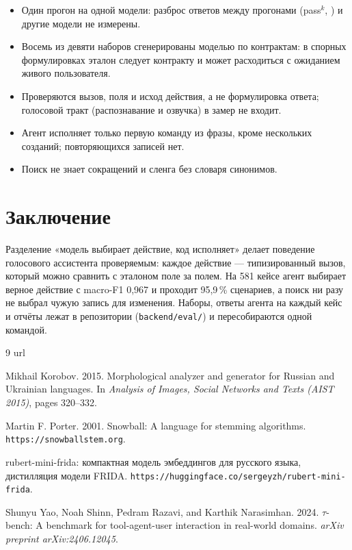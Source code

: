 \documentclass[10pt,a4paper,twocolumn]{article}
\newcommand{\code}[1]{\texttt{#1}}
\begin{document}
\begin{itemize}
  \item Один прогон на одной модели: разброс ответов между прогонами (pass$^k$,
    \citealp{yao2024taubench}) и другие модели не измерены.
  \item Восемь из девяти наборов сгенерированы моделью по контрактам: в спорных
    формулировках эталон следует контракту и может расходиться с ожиданием живого
    пользователя.
  \item Проверяются вызов, поля и исход действия, а не формулировка ответа; голосовой
    тракт (распознавание и озвучка) в замер не входит.
  \item Агент исполняет только первую команду из фразы, кроме нескольких созданий;
    повторяющихся записей нет.
  \item Поиск не знает сокращений и сленга без словаря синонимов.
\end{itemize}

\section{Заключение}

Разделение «модель выбирает действие, код исполняет» делает поведение голосового
ассистента проверяемым: каждое действие — типизированный вызов, который можно сравнить
с эталоном поле за полем. На 581 кейсе агент выбирает верное действие с macro-F1 0,967
и проходит 95,9\,\% сценариев, а поиск ни разу не выбрал чужую запись для изменения.
Наборы, ответы агента на каждый кейс и отчёты лежат в репозитории
(\code{backend/eval/}) и пересобираются одной командой.


\begin{thebibliography}{9}
\expandafter\ifx\csname url\endcsname\relax\def\url#1{\texttt{#1}}\fi

Mikhail Korobov. 2015. Morphological analyzer and generator for Russian and Ukrainian
languages. In \emph{Analysis of Images, Social Networks and Texts (AIST 2015)},
pages 320--332.

Martin F. Porter. 2001. Snowball: A language for stemming algorithms.
\url{https://snowballstem.org}.

rubert-mini-frida: компактная модель эмбеддингов для русского языка, дистилляция модели
FRIDA. \url{https://huggingface.co/sergeyzh/rubert-mini-frida}.

Shunyu Yao, Noah Shinn, Pedram Razavi, and Karthik Narasimhan. 2024. $\tau$-bench: A
benchmark for tool-agent-user interaction in real-world domains.
\emph{arXiv preprint arXiv:2406.12045}.

\end{thebibliography}
\end{document}
